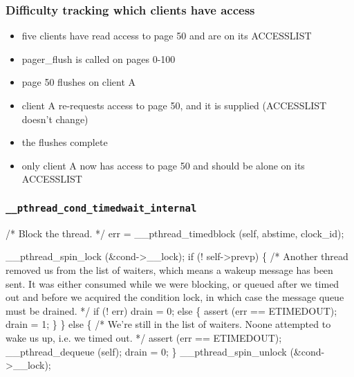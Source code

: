 \documentclass{beamer}
\begin{document}
\begin{frame}
\frametitle{Difficulty tracking which clients have access}




\begin{itemize}
\item five clients have read access to page 50 and are on its ACCESSLIST
\item pager\_flush is called on pages 0-100
\item page 50 flushes on client A
\item client A re-requests access to page 50, and it is supplied (ACCESSLIST doesn't change)
\item the flushes complete
\item only client A now has access to page 50 and should be alone on its ACCESSLIST
\end{itemize}


\end{frame}

\begin{frame}[fragile]
\frametitle{{\tt \_\_pthread\_cond\_timedwait\_internal}}
\begin{semiverbatim}
\tiny
  /* Block the thread.  */
  err = __pthread_timedblock (self, abstime, clock_id);

  __pthread_spin_lock (&cond->__lock);
  if (! self->prevp)
    \{
      /* Another thread removed us from the list of waiters, which means a
         wakeup message has been sent.  It was either consumed while we were
         blocking, or queued after we timed out and before we acquired the
         condition lock, in which case the message queue must be drained.  */
      if (! err)
        drain = 0;
      else
        \{
          assert (err == ETIMEDOUT);
          drain = 1;
        \}
    \}
  else
    \{
      /* We're still in the list of waiters.  Noone attempted to wake us up,
         i.e. we timed out.  */
      assert (err == ETIMEDOUT);
      __pthread_dequeue (self);
      drain = 0;
    \}
  __pthread_spin_unlock (&cond->__lock);
\end{semiverbatim}
\end{frame}
\end{document}
